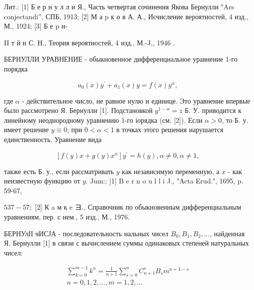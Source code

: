 \documentclass[10pt]{article}
\begin{document}
Лит.: [1] Б е р н у л л и Я., Часть четвертая сочинения Якова Бернулли "Ars conjectandi”, СПБ, 1913; [2] М а p к о в А. А., Исчисление вероятностей, 4 изд., М., 1924; [3] Б е p н-

II т й н С. Н., Теория вероятностей, 4 изд., М.-J., 1946 .



БЕРНУЛЛИ УРАВНЕНИЕ - обыкновенное дифференциальное уравнение 1-го порядка



\[

a_{0}(x) y^{\prime}+a_{1}(x) y=f(x) y^{\alpha},

\]



где $\alpha$ - действительное число, не равное нулю и единице. Это уравнение впервые было рассмотрено Я. Бернулли [1]. Подстановкой $y^{1-\alpha}=z$ Б. У. приводится к линейному неоднородному уравнению 1-го іорядка (см. [2]). Если $\alpha>0$, то Б. у. имеет решение $y \equiv 0$; при $0<\alpha<1$ в точках этого решения нарушается единственность. Уравнение вида



\[

\left[f(y) x+g(y) x^{\alpha}\right] y^{\prime}=h(y), \alpha \neq 0, \alpha \neq 1,

\]



также есть Б. у., если рассматривать $y$ как независимую переменную, а $x$ - как неизвестную функцию от $y$. Jum:: [1] B e r n o u l l i J., "Acta Erud.", 1695, p. 59-67,

$537-57 ;$ [2] К a м к e ヨ., Справочник по обыкновенным дифференциальным уравнениям, пер. с нем., 5 изд., М., 1976.



БЕРНУлІІ чИСЈА - последовательность нальных чисел $B_{0}, B_{1}, B_{2}, \ldots$, найденная Я. Бернулли [1] в связи с вычислением суммы одинаковых степеней натуральных чисел:



\[

\begin{gathered}

\sum_{k=0}^{m-1} k^{n}=\frac{1}{n+1} \sum_{s=0}^{n} C_{n+1}^{s} B_{s} m^{n+1-s} \\

n=0,1,2, \ldots, m=1,2, \ldots

\end{gathered}

\]
\end{document}

